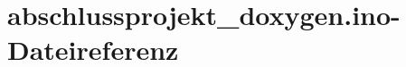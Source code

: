 \section{abschlussprojekt\+\_\+doxygen.\+ino-\/\+Dateireferenz}
\label{abschlussprojekt__doxygen_8ino}
